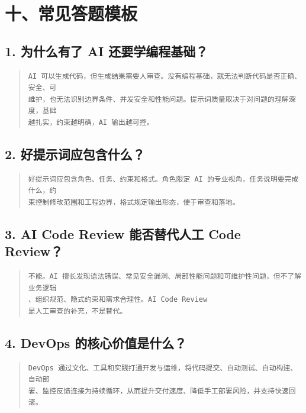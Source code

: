 \documentclass[UTF8,zihao=-4]{ctexart}
\begin{document}
\section{十、常见答题模板}

\subsection{1. 为什么有了 AI 还要学编程基础？}

\begin{quote}
\footnotesize
\begin{verbatim}
AI 可以生成代码，但生成结果需要人审查。没有编程基础，就无法判断代码是否正确、安全、可
维护，也无法识别边界条件、并发安全和性能问题。提示词质量取决于对问题的理解深度，基础
越扎实，约束越明确，AI 输出越可控。
\end{verbatim}
\end{quote}

\subsection{2. 好提示词应包含什么？}

\begin{quote}
\footnotesize
\begin{verbatim}
好提示词应包含角色、任务、约束和格式。角色限定 AI 的专业视角，任务说明要完成什么，约
束控制修改范围和工程边界，格式规定输出形态，便于审查和落地。
\end{verbatim}
\end{quote}

\subsection{3. AI Code Review 能否替代人工 Code Review？}

\begin{quote}
\footnotesize
\begin{verbatim}
不能。AI 擅长发现语法错误、常见安全漏洞、局部性能问题和可维护性问题，但不了解业务逻辑
、组织规范、隐式约束和需求合理性。AI Code Review 
是人工审查的补充，不是替代。
\end{verbatim}
\end{quote}

\subsection{4. DevOps 的核心价值是什么？}

\begin{quote}
\footnotesize
\begin{verbatim}
DevOps 通过文化、工具和实践打通开发与运维，将代码提交、自动测试、自动构建、自动部
署、监控反馈连接为持续循环，从而提升交付速度、降低手工部署风险，并支持快速回滚。
\end{verbatim}
\end{quote}
\end{document}
